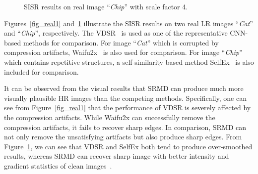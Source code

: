 \documentclass[10pt,twocolumn,letterpaper]{article}
\begin{document}
\begin{figure}[!t]
\begin{center}\vspace{-0.176cm}
\hspace{0.04cm}

\vspace{-0.23cm}
\hspace{0.04cm}
\caption{SISR results on real image ``\emph{Chip}'' with scale factor 4.}\label{fig_real2}
\end{center}\vspace{-0.7cm}
\end{figure}



Figures~\ref{fig_real1} and~\ref{fig_real2} illustrate the SISR results on two real LR images ``\emph{Cat}'' and  ``\emph{Chip}'', respectively.
The VDSR~\cite{kim2015accurate} is used as one of the representative CNN-based methods for comparison.
For image ``\emph{Cat}'' which is corrupted by compression artifacts, Waifu2x~\cite{waifu2x} is also used for comparison.
For image ``\emph{Chip}'' which contains repetitive structures, a self-similarity based method SelfEx~\cite{huang2015single} is also included for comparison.



It can be observed from the visual results that SRMD can produce much more visually plausible HR images than the competing methods.
Specifically, one can see from Figure~\ref{fig_real1} that the performance of VDSR is severely affected by the compression artifacts.
While Waifu2x can successfully remove the compression artifacts, it fails to recover sharp edges.
In comparison, SRMD can not only remove the unsatisfying artifacts but also produce sharp edges.
From Figure~\ref{fig_real2}, we can see that VDSR and SelfEx both tend to produce over-smoothed results,
whereas SRMD can recover sharp image with better intensity and gradient statistics of clean images~\cite{pan2014deblurring}.
\end{document}
